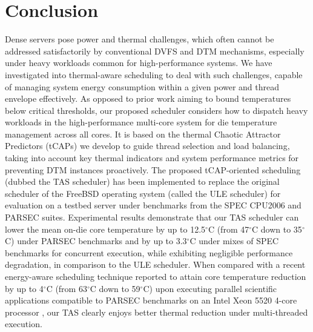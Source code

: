 \documentclass[times, 10pt,twocolumn]{IEEEtran}
\begin{document}
\section{Conclusion}
\label{sec:conclusion}
Dense servers pose power and thermal challenges, which often cannot be
addressed satisfactorily by conventional DVFS and DTM mechanisms,
especially under heavy workloads common for high-performance systems.
We have investigated into thermal-aware scheduling to deal with such
challenges, capable of managing system energy consumption within a given
power and thread envelope effectively.  As opposed to prior work aiming
to bound temperatures below critical thresholds, our proposed scheduler
considers how to dispatch heavy workloads in the high-performance
multi-core system for die temperature management across all cores.  It
is based on the thermal Chaotic Attractor Predictors (tCAPs) we develop
to guide thread selection and load balancing, taking into account key
thermal indicators and system performance metrics for preventing DTM
instances proactively.  The proposed tCAP-oriented scheduling (dubbed
the TAS scheduler) has been implemented to replace the original
scheduler of the FreeBSD operating system (called the ULE scheduler) for
evaluation on a testbed server under benchmarks from the SPEC CPU2006
and PARSEC suites.  Experimental results demonstrate that our TAS
scheduler can lower the mean on-die core temperature by up to
12.5$^{\circ}$C (from 47$^\circ$C down to 35$^\circ$C) 
under PARSEC benchmarks and by up to 3.3$^{\circ}$C under
mixes of SPEC benchmarks for concurrent execution, while exhibiting
negligible performance degradation, in comparison to the ULE scheduler.
When compared with a recent energy-aware scheduling technique reported
to attain core temperature reduction by up to 4$^\circ$C 
(from 63$^\circ$C down to 59$^\circ$C) upon executing 
parallel scientific applications compatible to PARSEC benchmarks 
on an Intel Xeon 5520 4-core processor \cite{Sarood2011}, our TAS
clearly enjoys better thermal reduction under multi-threaded execution.

\label{sec:references}
\begin{small}


\end{small}
\end{document}

